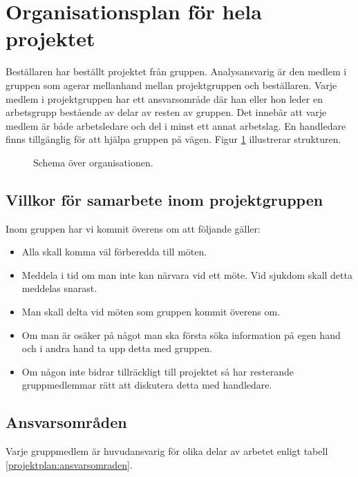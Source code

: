 \section{Organisationsplan för hela projektet}
Beställaren har beställt projektet från gruppen. Analysansvarig är den medlem i gruppen som agerar mellanhand mellan projektgruppen och beställaren. Varje medlem i projektgruppen har ett ansvarsområde där han eller hon leder en arbetsgrupp bestående av delar av resten av gruppen. Det innebär att varje medlem är både arbetsledare och del i minst ett annat arbetslag. En handledare finns tillgänglig för att hjälpa gruppen på vägen. Figur \ref{projektplan:organisationsplan} illustrerar strukturen.

\begin{figure}[H]
\center
{}%

%
\caption{Schema över organisationen.} \label{projektplan:organisationsplan}
\endcenter
\end{figure}

\subsection{Villkor för samarbete inom projektgruppen}
Inom gruppen har vi kommit överens om att följande gäller:
\begin{itemize}
\item{Alla skall komma väl förberedda till möten.}
\item{Meddela i tid om man inte kan närvara vid ett möte. Vid sjukdom skall detta meddelas snarast.}
\item{Man skall delta vid möten som gruppen kommit överens om.}
\item{Om man är osäker på något man ska första söka information på egen hand och i andra hand ta upp detta med gruppen.}
\item{Om någon inte bidrar tillräckligt till projektet så har resterande gruppmedlemmar rätt att diskutera detta med handledare.}
\end{itemize}

\newpage
\subsection{Ansvarsområden}
Varje gruppmedlem är huvudansvarig för olika delar av arbetet enligt tabell \ref{projektplan:ansvarsomraden}.

